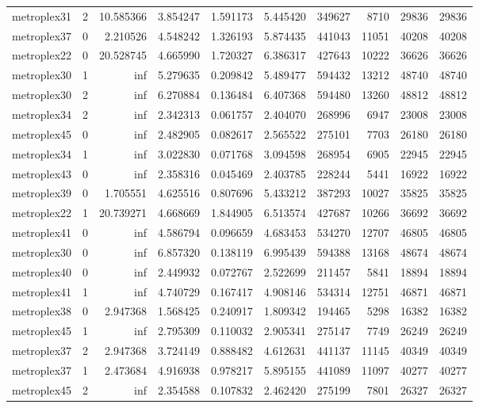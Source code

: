 \begin{longtable}{|l|r|r|r|r|r|r|r|r|r|}
metroplex31 & 2 & 10.585366 & 3.854247 & 1.591173 & 5.445420 & 349627 & 8710 & 29836 & 29836 \\
metroplex37 & 0 & 2.210526 & 4.548242 & 1.326193 & 5.874435 & 441043 & 11051 & 40208 & 40208 \\
metroplex22 & 0 & 20.528745 & 4.665990 & 1.720327 & 6.386317 & 427643 & 10222 & 36626 & 36626 \\
metroplex30 & 1 & inf & 5.279635 & 0.209842 & 5.489477 & 594432 & 13212 & 48740 & 48740 \\
metroplex30 & 2 & inf & 6.270884 & 0.136484 & 6.407368 & 594480 & 13260 & 48812 & 48812 \\
metroplex34 & 2 & inf & 2.342313 & 0.061757 & 2.404070 & 268996 & 6947 & 23008 & 23008 \\
metroplex45 & 0 & inf & 2.482905 & 0.082617 & 2.565522 & 275101 & 7703 & 26180 & 26180 \\
metroplex34 & 1 & inf & 3.022830 & 0.071768 & 3.094598 & 268954 & 6905 & 22945 & 22945 \\
metroplex43 & 0 & inf & 2.358316 & 0.045469 & 2.403785 & 228244 & 5441 & 16922 & 16922 \\
metroplex39 & 0 & 1.705551 & 4.625516 & 0.807696 & 5.433212 & 387293 & 10027 & 35825 & 35825 \\
metroplex22 & 1 & 20.739271 & 4.668669 & 1.844905 & 6.513574 & 427687 & 10266 & 36692 & 36692 \\
metroplex41 & 0 & inf & 4.586794 & 0.096659 & 4.683453 & 534270 & 12707 & 46805 & 46805 \\
metroplex30 & 0 & inf & 6.857320 & 0.138119 & 6.995439 & 594388 & 13168 & 48674 & 48674 \\
metroplex40 & 0 & inf & 2.449932 & 0.072767 & 2.522699 & 211457 & 5841 & 18894 & 18894 \\
metroplex41 & 1 & inf & 4.740729 & 0.167417 & 4.908146 & 534314 & 12751 & 46871 & 46871 \\
metroplex38 & 0 & 2.947368 & 1.568425 & 0.240917 & 1.809342 & 194465 & 5298 & 16382 & 16382 \\
metroplex45 & 1 & inf & 2.795309 & 0.110032 & 2.905341 & 275147 & 7749 & 26249 & 26249 \\
metroplex37 & 2 & 2.947368 & 3.724149 & 0.888482 & 4.612631 & 441137 & 11145 & 40349 & 40349 \\
metroplex37 & 1 & 2.473684 & 4.916938 & 0.978217 & 5.895155 & 441089 & 11097 & 40277 & 40277 \\
metroplex45 & 2 & inf & 2.354588 & 0.107832 & 2.462420 & 275199 & 7801 & 26327 & 26327 \\

\end{longtable}
